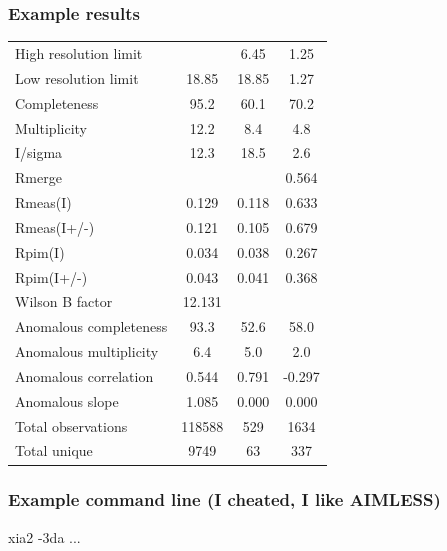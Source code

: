 \documentclass[slides,compress]{beamer}
\begin{document}
\begin{frame}
\frametitle{Example results}
\begin{tabular}{lccc}
High resolution limit      &       \color{red}{1.25} &    6.45 &   1.25\\
Low resolution limit       &                18.85  & 18.85  &  1.27\\
Completeness               &                95.2   & 60.1  &  70.2\\
Multiplicity               &               12.2    & 8.4   &  4.8\\
I/sigma                    &               12.3    & 18.5   &  2.6\\
Rmerge                     &             \color{red}{0.113}  & 
\color{red}{0.096} &  0.564\\
Rmeas(I)                   &             0.129  & 0.118 &  0.633\\
Rmeas(I+/-)                &             0.121  & 0.105 &  0.679\\
Rpim(I)                    &             0.034  & 0.038 &  0.267\\
Rpim(I+/-)                 &             0.043  & 0.041 &  0.368\\
Wilson B factor            &            12.131& & \\
Anomalous completeness     &            93.3  &  52.6  &  58.0\\
Anomalous multiplicity     &           6.4    & 5.0  &   2.0\\
Anomalous correlation      &            0.544 &  0.791 & -0.297\\
Anomalous slope            &      1.085 &  0.000 &  0.000\\
Total observations         &       118588 & 529  &   1634\\
Total unique               &         9749  &  63 &     337\\
\end{tabular}
\end{frame}

\begin{frame}
\frametitle{Example command line (I cheated, I like AIMLESS)}
{ \huge
xia2 -3da ...
}
\end{frame}
\end{document}
